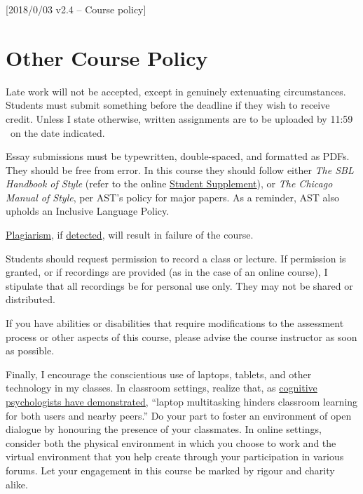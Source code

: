[2018/0/03 v2.4 -- Course policy]

\section{Other Course Policy}
\label{policy}

Late work will not be accepted, except in genuinely extenuating
circumstances. Students must submit something before the deadline if
they wish to receive credit. Unless I state otherwise, written
assignments are to be uploaded by 11:59 \PM\ on the date indicated.

Essay submissions must be typewritten, double-spaced, and formatted as
PDFs. They should be free from error. In this course they should follow
either \emph{The SBL Handbook of Style} (refer to the online
\href{https://www.sbl-site.org/assets/pdfs/pubs/SBLHSsupp2015-02.pdf}{
Student Supplement}), or \emph{The Chicago Manual of Style}, per AST's
policy for major papers. As a reminder, AST also upholds an Inclusive
Language Policy.

\href{http://www.eerdmans.com/Pages/Item/59043/Commentary-Statement.aspx}{Plagiarism},
if \href{https://www.theguardian.com/world/2013/feb/09/german-education-minister-quits-phd-plagiarism}{detected},
will result in failure of the course.

Students should request permission to record a class or lecture. If
permission is granted, or if recordings are provided (as in the case of
an online course), I stipulate that all recordings be for personal use
only. They may not be shared or distributed.

If you have abilities or disabilities that require modifications to the
assessment process or other aspects of this course, please advise the
course instructor as soon as possible.

Finally, I encourage the conscientious use of laptops, tablets, and
other technology in my classes. In classroom settings, realize that, as
\href{http://dx.doi.org/10.1016/j.compedu.2012.10.003}{cognitive
psychologists have demonstrated}, ``laptop multitasking hinders
classroom learning for both users and nearby peers.'' Do your part to
foster an environment of open dialogue by honouring the presence of your
classmates. In online settings, consider both the physical environment
in which you choose to work and the virtual environment that you help
create through your participation in various forums. Let your engagement
in this course be marked by rigour and charity alike.